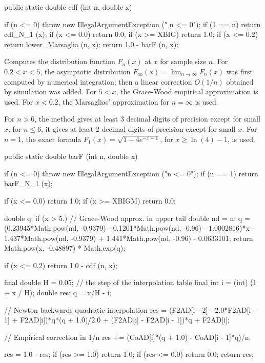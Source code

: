 \begin{code}
   public static double cdf (int n, double x)\begin{hide} {
      if (n <= 0)
         throw new IllegalArgumentException ("   n <= 0");
      if (1 == n)
         return cdf_N_1 (x);
      if (x <= 0.0)
         return 0.0;
      if (x >= XBIG)
         return 1.0;
      if (x <= 0.2)
         return lower_Marsaglia (n, x);
      return 1.0 - barF (n, x);
   }\end{hide}
\end{code}
\begin{tabb}
  Computes the \ad{} distribution function $F_n(x)$ at $x$ for sample size $n$.
  For $0.2 < x < 5$,
  the asymptotic distribution  $F_\infty(x) = \lim_{n\to\infty} F_n(x)$
  was first computed by numerical integration;
  then a linear correction $O(1/n)$ obtained by simulation was added.
  For $5 < x$, the Grace-Wood empirical approximation
  \cite{tGRA12a} is used. %
  For $x < 0.2$, the Marsaglias' approximation \cite{tMAR04a} for $n=\infty$ is used.

  For $n>6$, the method gives at least 3 decimal digits of precision except
  for small $x$;
  for $n \le 6$, it gives at least 2 decimal digits of precision except for small $x$.
  For $n=1$, the exact formula
  $F_1(x) = \sqrt{1 - 4e^{-x-1}}$, for $x\ge \ln(4) - 1$, is used.
 \end{tabb}
\begin{code}

   public static double barF (int n, double x)\begin{hide} {
      if (n <= 0)
         throw new IllegalArgumentException ("n <= 0");
      if (n == 1)
         return barF_N_1 (x);

      if (x <= 0.0)
         return 1.0;
      if (x >= XBIGM)
         return 0.0;

      double q;
      if (x > 5.) {
         // Grace-Wood approx. in upper tail
         double nd = n;
         q = (0.23945*Math.pow(nd, -0.9379) - 0.1201*Math.pow(nd, -0.96) -
             1.0002816)*x - 1.437*Math.pow(nd, -0.9379) +
             1.441*Math.pow(nd, -0.96) - 0.0633101;
         return Math.pow(x, -0.48897) * Math.exp(q);
      }

      if (x <= 0.2)
         return 1.0 - cdf (n, x);

      final double H = 0.05;  // the step of the interpolation table
      final int i = (int) (1 +  x / H);
      double res;
      q = x/H - i;

      // Newton backwards quadratic interpolation
      res = (F2AD[i - 2] - 2.0*F2AD[i - 1] + F2AD[i])*q*(q + 1.0)/2.0
         + (F2AD[i] - F2AD[i - 1])*q + F2AD[i];

      // Empirical correction in 1/n
      res += (CoAD[i]*(q + 1.0) - CoAD[i - 1]*q)/n;

      res = 1.0 - res;
      if (res >= 1.0)
         return 1.0;
      if (res <= 0.0)
         return 0.0;
   return res;
   }\end{hide}
\end{code}
